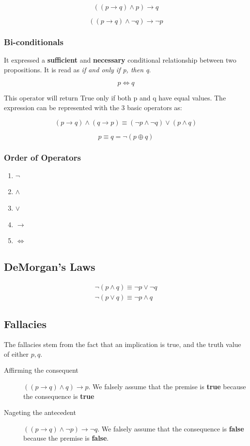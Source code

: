 \documentclass[11pt]{article}
\begin{document}
\[
((p \to q) \land p) \to q
\]

\[
((p \to q) \land \neg q) \to \neg p
\]

\subsubsection{Bi-conditionals}
\label{sec:orgff9ef26}
It expressed a \textbf{sufficient} and \textbf{necessary} conditional relationship between two propositions. It is read as \emph{if and only if p, then q}.

\[
p \Leftrightarrow q
\]

This operator will return True only if both p and q have equal values. The expression can be represented with the 3 basic operators as:

\[
(p \to q) \land (q \to p) \equiv (\neg p \land \neg q) \lor (p \land q)
\]

\[
p \equiv q = \neg (p \oplus q)
\]

\subsubsection{Order of Operators}
\label{sec:orgd68dfd2}
\begin{enumerate}
\item \(\neg\)
\item \(\land\)
\item \(\lor\)
\item \(\to\)
\item \(\Leftrightarrow\)
\end{enumerate}

\subsection{DeMorgan's Laws}
\label{sec:org55a97fc}
\begin{align}
\neg (p \land q) \equiv \neg p \lor \neg q \\
\neg (p \lor q) \equiv \neg p \land q
\end{align}

\subsection{Fallacies}
\label{sec:org7c58c46}
The fallacies stem from the fact that an implication is true, and the truth value of either \(p,q\).
\begin{description}
\item[{Affirming the consequent}] \(((p \to q) \land q) \to p\). We falsely assume that the premise is \textbf{true} because the consequence is \textbf{true}
\item[{Nageting the antecedent}] \(((p \to q) \land \neg p) \to \neg q\). We falsely assume that the consequence is \textbf{false} because the premise is \textbf{false}.
\end{description}
\end{document}
